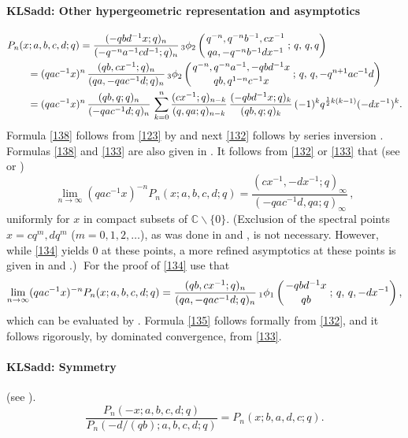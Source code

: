 \documentclass[envcountchap,graybox]{svmono}
\newcounter{rom}
\newcommand{\qhyp}[5]{\mbox{}_{#1}{\phi}_{#2}
\left(\genfrac{}{}{0pt}{}{#3}{#4}\,;\,q,\,#5\right)}
\newcommand\CC{\mathbb{C}}
\newcommand\half{\frac12}
\newcommand\iy\infty
\newcommand{\qhyp}[5]{\,\mbox{}_{#1}\phi_{#2}\!\left(
  \genfrac{}{}{0pt}{}{#3}{#4};#5\right)}
\begin{document}
\paragraph{\large\bf KLSadd: Other hypergeometric representation and asymptotics}\begin{align}
&P_n(x;a,b,c,d;q)
=\frac{(-qbd^{-1}x;q)_n}{(-q^{-n}a^{-1}cd^{-1};q)_n}\,
\qhyp32{q^{-n},q^{-n}b^{-1},cx^{-1}}{qa,-q^{-n}b^{-1}dx^{-1}}{q,q}
\label{138}\\
&\qquad=(qac^{-1}x)^n\,\frac{(qb,cx^{-1};q)_n}{(qa,-qac^{-1}d;q)_n}\,
\qhyp32{q^{-n},q^{-n}a^{-1},-qbd^{-1}x}{qb,q^{1-n}c^{-1}x}
{q,-q^{n+1}ac^{-1}d}
\label{132}\\
&\qquad=(qac^{-1}x)^n\,\frac{(qb,q;q)_n}{(-qac^{-1}d;q)_n}\,
\sum_{k=0}^n\frac{(cx^{-1};q)_{n-k}}{(q,qa;q)_{n-k}}\,
\frac{(-qbd^{-1}x;q)_k}{(qb,q;q)_k}\,(-1)^k q^{\half k(k-1)}(-dx^{-1})^k.
\label{133}
\end{align}
Formula \eqref{138} follows from \eqref{123} by
 and next \eqref{132} follows by series inversion
.
Formulas \eqref{138} and \eqref{133} are also given in
.
It follows from \eqref{132} or \eqref{133} that
(see  or )
\begin{equation}
\lim_{n\to\iy}(qac^{-1}x)^{-n} P_n(x;a,b,c,d;q)
=\frac{(cx^{-1},-dx^{-1};q)_\iy}{(-qac^{-1}d,qa;q)_\iy}\,,
\label{134}
\end{equation}
uniformly for $x$ in compact subsets of $\CC\backslash\{0\}$.
(Exclusion of the spectral points $x=cq^m,dq^m$ ($m=0,1,2,\ldots$),
as was done in  and , is not necessary. However,
while \eqref{134} yields 0 at these points, a more refined asymptotics
at these points is given in  and .)$\;$
For the proof of \eqref{134} use that
\begin{equation}
\lim_{n\to\iy}(qac^{-1}x)^{-n} P_n(x;a,b,c,d;q)
=\frac{(qb,cx^{-1};q)_n}{(qa,-qac^{-1}d;q)_n}\,
\qhyp11{-qbd^{-1}x}{qb}{q,-dx^{-1}},
\label{135}
\end{equation}
which can be evaluated by .
Formula \eqref{135} follows formally from \eqref{132}, and it follows rigorously, by
dominated convergence, from \eqref{133}.
%
\paragraph{\large\bf KLSadd: Symmetry}(see \cite[\S2.5]{K17}).
\begin{equation}
\frac{P_n(-x;a,b,c,d;q)}{P_n(-d/(qb);a,b,c,d;q)}
=P_n(x;b,a,d,c;q).
\end{equation}
%
\end{document}
